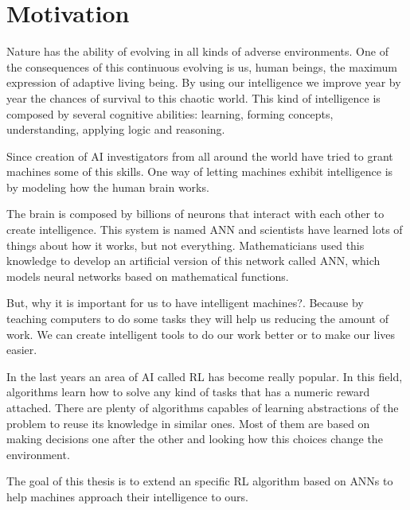 \chapter{Motivation}
Nature has the ability of evolving in all kinds of adverse environments.
One of the consequences of this continuous evolving is us, human beings,
the maximum expression of adaptive living being.
By using our intelligence we improve year by year the chances of survival
to this chaotic world.
This kind of intelligence is composed by several cognitive abilities: learning,
forming concepts, understanding, applying logic and reasoning.

Since creation of \acf{AI} investigators from all around
the world have tried to grant machines some of this skills.
One way of letting machines exhibit intelligence is by modeling how the human brain works.

The brain is composed by billions of neurons that interact with each other to create intelligence.
This system is named \acf{ANN} and scientists have learned lots of things about how it works,
but not everything.
Mathematicians used this knowledge to develop an artificial version of this network called
\acf{ANN}, which models neural networks based on mathematical functions.

But, why it is important for us to have intelligent machines?.
Because by teaching computers to do some tasks they will help us reducing the amount of work.
We can create intelligent tools to do our work better or to make our lives easier.

In the last years an area of \ac{AI} called \acf{RL} has become really popular.
In this field, algorithms learn how to solve any kind of tasks that has a numeric reward attached.
There are plenty of algorithms capables of learning abstractions of the problem to reuse its knowledge in similar ones.
Most of them are based on making decisions one after the other and looking how this choices change the environment.

The goal of this thesis is to extend an specific \ac{RL} algorithm based on \acp{ANN} to help machines approach their
intelligence to ours.


